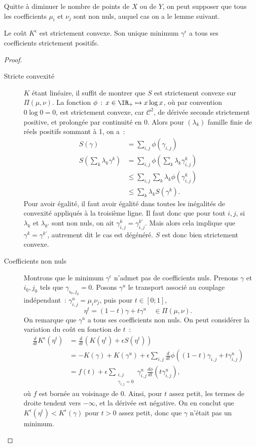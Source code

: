 Quitte à diminuer le nombre de points de $X$ ou de $Y$, on peut supposer que tous les coefficients $\mu_i$ et $\nu_j$ sont non nuls, auquel cas on a le lemme suivant.
\begin{lemma}
Le coût $K^\epsilon$ est strictement convexe. Son unique minimum $\gamma^\epsilon$ a tous ses coefficients strictement positifs.
\end{lemma}
\begin{proof}
\begin{description}
\item[Stricte convexité]
$K$ étant linéaire, il suffit de montrer que $S$ est strictement convexe sur $\Pi(\mu,\nu)$.
La fonction $\phi\,:\, x \in \IR_+ \mapsto x \log x$, où par convention $0 \log 0 = 0$, est strictement convexe, car $\mathcal{C}^2$, de dérivée seconde strictement positive, et prolongée par continuité en 0.
Alors pour $(\lambda_k)$ famille finie de réels positifs sommant à 1, on a~:
\[\begin{split}
S(\gamma) &= \sum_{i,j} \phi(\gamma_{i,j}) \\
S\left(\sum_k \lambda_k \gamma^k\right) &= \sum_{i,j} \phi\left(\sum_k \lambda_k \gamma^k_{i,j}\right) \\
& \le \sum_{i,j} \sum_{k} \lambda_k \phi\left(\gamma^k_{i,j}\right) \\
& \le \sum_{k} \lambda_k S\left(\gamma^k\right) .
\end{split}\]
Pour avoir égalité, il faut avoir égalité dans toutes les inégalités de convexité appliqués à la troisième ligne. Il faut donc que pour tout $i,j$, si $\lambda_k$ et $\lambda_{k'}$ sont non nuls, on ait $\gamma_{i,j}^k = \gamma_{i,j}^{k'}$. Mais alors cela implique que $\gamma^k = \gamma^{k'}$, autrement dit le cas est dégénéré. $S$ est donc bien strictement convexe.
\item[Coefficients non nuls]
Montrons que le minimum $\gamma^\epsilon$ n'admet pas de coefficients nuls. Prenons $\gamma$ et $i_0,j_0$ tels que $\gamma_{i_0,j_0} = 0$. Posons $\gamma^u$ le transport associé au couplage indépendant~: $\gamma^u_{i,j} = \mu_i \nu_j$, puis pour $t \in [0;1]$,
\[ \eta^t = (1-t) \gamma + t \gamma^u \quad \in \Pi(\mu,\nu) .\]
On remarque que $\gamma^u$ a tous ses coefficients non nuls. On peut considérer la variation du coût en fonction de $t$~:
\[\begin{split}
\frac{d}{dt} K^\epsilon(\eta^t) &= \frac{d}{dt}\left( K(\eta^t) + \epsilon S(\eta^t) \right) \\
& = - K(\gamma) + K(\gamma^u) + \epsilon \sum_{i,j} \frac{d}{dt} \phi((1-t) \gamma_{i,j} + t \gamma^u_{i,j}) \\
& = f(t) + \epsilon \sum_{\substack{i,j \\ \gamma_{i,j} = 0}} \gamma^u_{i,j}\frac{d\phi}{dt}(t \gamma^u_{i,j})  ,
\end{split}\]
où $f$ est bornée au voisinage de 0. Ainsi, pour $t$ assez petit, les termes de droite tendent vers $-\infty$, et la dérivée est négative. On en conclut que $K^\epsilon(\eta^t) < K^\epsilon(\gamma)$ pour $t>0$ assez petit, donc que $\gamma$ n'était pas un minimum.
\end{description}
\end{proof}

